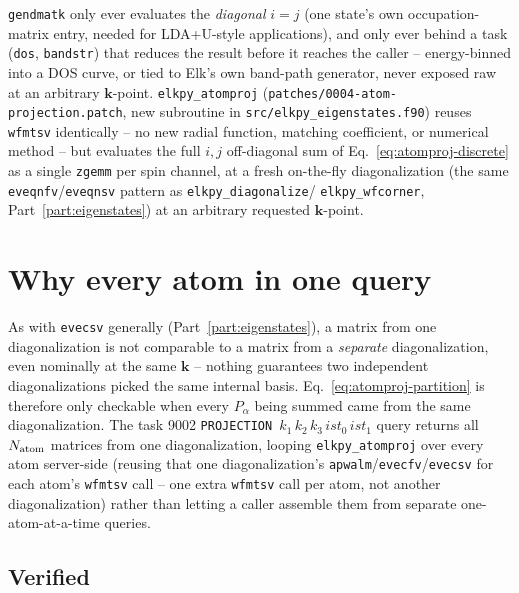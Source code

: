 \documentclass[11pt]{article}
\begin{document}
\texttt{gendmatk} only ever evaluates the \emph{diagonal} $i=j$ (one state's own
occupation-matrix entry, needed for LDA+U-style applications), and only ever behind a
task (\texttt{dos}, \texttt{bandstr}) that reduces the result before it reaches the
caller -- energy-binned into a DOS curve, or tied to Elk's own band-path generator, never
exposed raw at an arbitrary $\mathbf k$-point. \texttt{elkpy\_atomproj}
(\texttt{patches/0004-atom-projection.patch}, new subroutine in
\texttt{src/elkpy\_eigenstates.f90}) reuses \texttt{wfmtsv} identically -- no new radial
function, matching coefficient, or numerical method -- but evaluates the full
$i,j$ off-diagonal sum of Eq.~\eqref{eq:atomproj-discrete} as a single \texttt{zgemm} per
spin channel, at a fresh on-the-fly diagonalization (the same
\texttt{eveqnfv}/\texttt{eveqnsv} pattern as \texttt{elkpy\_diagonalize}/
\texttt{elkpy\_wfcorner}, Part~\ref{part:eigenstates}) at an arbitrary requested
$\mathbf k$-point.

\section{Why every atom in one query}

As with \texttt{evecsv} generally (Part~\ref{part:eigenstates}), a matrix from one
diagonalization is not comparable to a matrix from a \emph{separate} diagonalization,
even nominally at the same $\mathbf k$ -- nothing guarantees two independent
diagonalizations picked the same internal basis. Eq.~\eqref{eq:atomproj-partition} is
therefore only checkable when every $P_\alpha$ being summed came from the same
diagonalization. The task 9002 \texttt{PROJECTION $k_1\,k_2\,k_3\,ist_0\,ist_1$} query
returns all $N_{\rm atom}$ matrices from one diagonalization, looping
\texttt{elkpy\_atomproj} over every atom server-side (reusing that one diagonalization's
\texttt{apwalm}/\texttt{evecfv}/\texttt{evecsv} for each atom's \texttt{wfmtsv} call --
one extra \texttt{wfmtsv} call per atom, not another diagonalization) rather than
letting a caller assemble them from separate one-atom-at-a-time queries.

\subsection{Verified}
\end{document}
